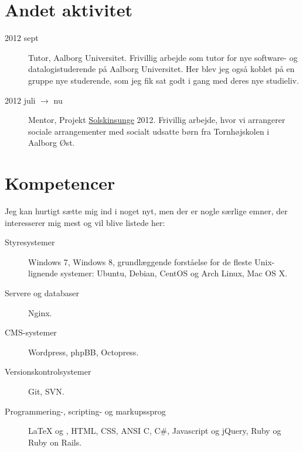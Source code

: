 \documentclass[margin,line,a4paper]{resume}
\begin{document}
\begin{resume}
\begin{description}
\end{description}
\pagebreak

\section{\mysidestyle Andet aktivitet}\vspace{1mm}
\begin{description}
  \item[2012 sept] Tutor, Aalborg Universitet. Frivillig arbejde som tutor for
    nye software- og datalogistuderende på Aalborg Universitet. Her blev jeg også koblet på en
    gruppe nye studerende, som jeg fik sat godt i gang med deres nye studieliv.
  \item[2012 juli $\rightarrow$ nu] Mentor, Projekt \href{http://www.urk.dk/solskinsunge/}{Solskinsunge} 2012. Frivillig arbejde,
    hvor vi arrangerer sociale arrangementer med socialt udsatte børn fra Tornhøjskolen 
    i Aalborg Øst.
\end{description}

\section{\mysidestyle Kompetencer}\vspace{1mm} Jeg kan
hurtigt sætte mig ind i noget nyt, men der er nogle særlige emner, der
interesserer mig mest og vil blive listede her:
\vspace{0.5cm}
\begin{description}

  \item[Styresystemer] Windows 7, Windows 8, grundlæggende forståelse
  for de fleste Unix-lignende systemer: Ubuntu, Debian, CentOS og Arch
  Linux, Mac OS X.

  \item[Servere og databaser] Nginx. 

  \item[CMS-systemer] Wordpress, phpBB, Octopress.

  \item[Versionskontrolsystemer] Git, SVN.

  \item[Programmering-, scripting- og markupssprog] \LaTeX{} og \XeTeX{},
    HTML, CSS, ANSI C, C\#, Javascript og jQuery, Ruby og Ruby on Rails. 


\end{description}
\end{resume}
\end{document}
